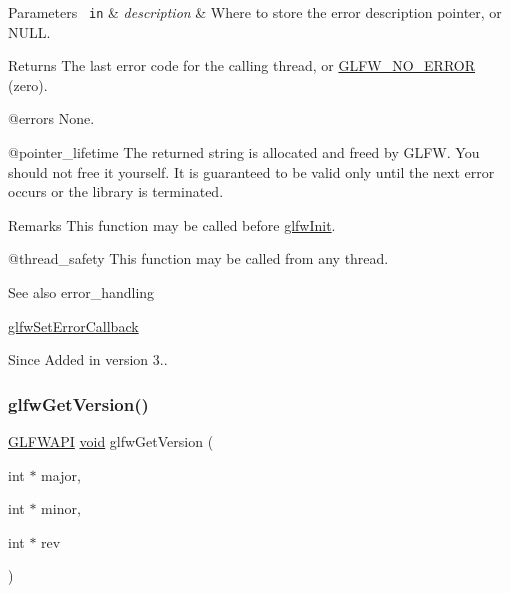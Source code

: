 \begin{DoxyParams}[1]{Parameters}
\mbox{\texttt{ in}}  & {\em description} & Where to store the error description pointer, or {\ttfamily N\+U\+LL}. \\
\hline
\end{DoxyParams}
\begin{DoxyReturn}{Returns}
The last error code for the calling thread, or \mbox{\hyperlink{group__errors_gafa30deee5db4d69c4c93d116ed87dbf4}{G\+L\+F\+W\+\_\+\+N\+O\+\_\+\+E\+R\+R\+OR}} (zero).
\end{DoxyReturn}
@errors None.

@pointer\+\_\+lifetime The returned string is allocated and freed by G\+L\+FW. You should not free it yourself. It is guaranteed to be valid only until the next error occurs or the library is terminated.

\begin{DoxyRemark}{Remarks}
This function may be called before \mbox{\hyperlink{group__init_gab41771f0215a2e0afb4cf1cf98082d40}{glfw\+Init}}.
\end{DoxyRemark}
@thread\+\_\+safety This function may be called from any thread.

\begin{DoxySeeAlso}{See also}
error\+\_\+handling 

\mbox{\hyperlink{group__init_ga5919096b958c47102126061fb5a6f9c3}{glfw\+Set\+Error\+Callback}}
\end{DoxySeeAlso}
\begin{DoxySince}{Since}
Added in version 3.. 
\end{DoxySince}
\mbox{\label{group__init_ga2402c7824ac0194c13722790ff9559ff}} 
\subsubsection{\texorpdfstring{glfwGetVersion()}{glfwGetVersion()}}
{\footnotesize\ttfamily \mbox{\hyperlink{glfw3_8h_a56da5036b2cc259351ae22fd6439bb47}{G\+L\+F\+W\+A\+PI}} \mbox{\hyperlink{glad_8h_a950fc91edb4504f62f1c577bf4727c29}{void}} glfw\+Get\+Version (\begin{DoxyParamCaption}\item[{int $\ast$}]{major,  }\item[{int $\ast$}]{minor,  }\item[{int $\ast$}]{rev }\end{DoxyParamCaption})}



